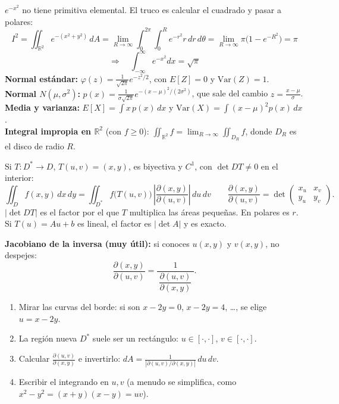 \documentclass[11pt,a4paper]{article}
\newcommand{\R}{\mathbb{R}}
\newcommand{\dA}{\,dA}
\begin{document}
\begin{resumen}
$e^{-x^2}$ no tiene primitiva elemental. El truco es calcular el cuadrado y pasar a polares:
\[
I^2=\iint_{\R^2}e^{-(x^2+y^2)}\dA=\lim_{R\to\infty}\int_0^{2\pi}\!\!\int_0^R e^{-r^2}r\,dr\,d\theta=\lim_{R\to\infty}\pi\big(1-e^{-R^2}\big)=\pi
\]
\[
\Longrightarrow\quad\boxed{\int_{-\infty}^{\infty}e^{-x^2}dx=\sqrt\pi}
\]
\textbf{Normal estándar:} $\varphi(z)=\frac1{\sqrt{2\pi}}e^{-z^2/2}$, con $E[Z]=0$ y $\mathrm{Var}(Z)=1$.\\
\textbf{Normal $N(\mu,\sigma^2)$:} $p(x)=\frac{1}{\sigma\sqrt{2\pi}}e^{-(x-\mu)^2/(2\sigma^2)}$, que sale del cambio $z=\frac{x-\mu}{\sigma}$.\\
\textbf{Media y varianza:} $E[X]=\int x\,p(x)\,dx$ y $\mathrm{Var}(X)=\int(x-\mu)^2p(x)\,dx$.\\
\textbf{Integral impropia en $\R^2$} (con $f\ge0$): $\iint_{\R^2}f=\lim_{R\to\infty}\iint_{D_R}f$, donde $D_R$ es el disco de radio $R$.
\end{resumen}

\begin{resumen}
Si $T:D^*\to D$, $T(u,v)=(x,y)$, es biyectiva y $C^1$, con $\det DT\neq0$ en el interior:
\[
\boxed{\iint_D f(x,y)\,dx\,dy=\iint_{D^*} f\big(T(u,v)\big)\,\left|\frac{\partial(x,y)}{\partial(u,v)}\right|\,du\,dv}
\qquad \frac{\partial(x,y)}{\partial(u,v)}=\det\begin{pmatrix}x_u&x_v\\y_u&y_v\end{pmatrix}.
\]
$|\det DT|$ es el factor por el que $T$ multiplica las áreas pequeñas. En polares es $r$. Si $T(u)=Au+b$ es lineal, el factor es $|\det A|$ y es exacto.

\textbf{Jacobiano de la inversa (muy útil):} si conoces $u(x,y)$ y $v(x,y)$, no despejes:
\[
\frac{\partial(x,y)}{\partial(u,v)}=\frac{1}{\ \dfrac{\partial(u,v)}{\partial(x,y)}\ }.
\]
\end{resumen}

\begin{receta}
\begin{enumerate}[leftmargin=*,itemsep=1pt]
\item Mirar las curvas del borde: si son $x-2y=0$, $x-2y=4$, \dots, se elige $u=x-2y$.
\item La región nueva $D^*$ suele ser un rectángulo: $u\in[\cdot,\cdot]$, $v\in[\cdot,\cdot]$.
\item Calcular $\frac{\partial(u,v)}{\partial(x,y)}$ e invertirlo: $dA=\frac{1}{|\partial(u,v)/\partial(x,y)|}\,du\,dv$.
\item Escribir el integrando en $u,v$ (a menudo se simplifica, como $x^2-y^2=(x+y)(x-y)=uv$).
\end{enumerate}
\end{receta}
\end{document}
